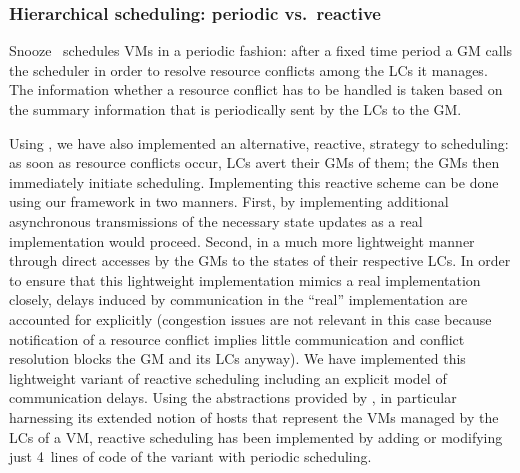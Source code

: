 

\subsubsection{Hierarchical scheduling: periodic vs.\  reactive}

Snooze~\cite{feller:ccgrid12} schedules VMs in a periodic fashion:
after a fixed time period a GM calls the scheduler in order to resolve
resource conflicts among the LCs it manages. The information whether a
resource conflict has to be handled is taken based on the summary
information that is periodically sent by the LCs to the GM.

Using \vmps, we have also implemented an alternative, reactive,
strategy to scheduling: as soon as resource conflicts occur, LCs avert
their GMs of them; the GMs then immediately initiate
scheduling. Implementing this reactive scheme can be done using our
framework in two manners. First, by implementing additional
asynchronous transmissions of the necessary state updates as a real
implementation would proceed. Second, in a much more lightweight
manner through direct accesses by the GMs to the states of their
respective LCs. In order to ensure that this lightweight
implementation mimics a real implementation closely, delays induced by
communication in the ``real'' implementation are accounted for
explicitly (congestion issues are not relevant in this case because
notification of a resource conflict implies little communication and
conflict resolution blocks the GM and its LCs anyway). We have
implemented this lightweight variant of reactive scheduling including
an explicit model of communication delays. Using the abstractions
provided by \vmps, in particular harnessing its extended notion of
hosts that represent the VMs managed by the LCs of a VM, reactive
scheduling has been implemented by adding or modifying just 4~lines of
code of the variant with periodic scheduling.

